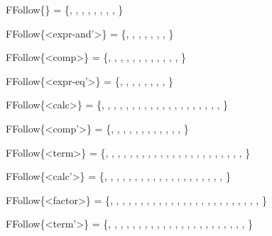 FFollow\{<expr-eq>\}         = \{\lit{\&\&}, \lit{||}, \lit{=}, \lit{\{}, \lit{)}, \lit{;}, \lit{,}, , \}

FFollow\{<expr-and'>\}       = \{\lit{||}, \lit{=}, \lit{\{}, \lit{)}, \lit{;}, \lit{,}, , \}

FFollow\{<comp>\}            = \{\lit{==}, \lit{!=}, , , \lit{\&\&}, \lit{||}, \lit{=}, \lit{\{}, \lit{)}, \lit{;}, \lit{,}, , \}

FFollow\{<expr-eq'>\}        = \{\lit{\&\&}, \lit{||}, \lit{=}, \lit{\{}, \lit{)}, \lit{;}, \lit{,}, , \}

FFollow\{<calc>\}            = \{\lit{>}, \lit{\textless}, \lit{\textless=}, \lit{>=}, , , , , \lit{==}, \lit{!=}, , , \lit{\&\&}, \lit{||}, \lit{=}, \lit{\{}, \lit{)}, \lit{;}, \lit{,}, , \}

FFollow\{<comp'>\}           = \{\lit{==}, \lit{!=}, , , \lit{\&\&}, \lit{||}, \lit{=}, \lit{\{}, \lit{)}, \lit{;}, \lit{,}, , \}

FFollow\{<term>\}            = \{\lit{+}, \lit{-}, , \lit{>}, \lit{\textless}, \lit{\textless=}, \lit{>=}, , , , , \lit{==}, \lit{!=}, , , \lit{\&\&}, \lit{||}, \lit{=}, \lit{\{}, \lit{)}, \lit{;}, \lit{,}, , \}

FFollow\{<calc'>\}           = \{\lit{>}, \lit{\textless}, \lit{\textless=}, \lit{>=}, , , , , \lit{==}, \lit{!=}, , , \lit{\&\&}, \lit{||}, \lit{=}, \lit{\{}, \lit{)}, \lit{;}, \lit{,}, , \}

FFollow\{<factor>\}          = \{\lit{*}, \lit{/}, \lit{+}, \lit{-}, , \lit{>}, \lit{\textless}, \lit{\textless=}, \lit{>=}, , , , , \lit{==}, \lit{!=}, , , \lit{\&\&}, \lit{||}, \lit{=}, \lit{\{}, \lit{)}, \lit{;}, \lit{,}, , \}

FFollow\{<term'>\}           = \{\lit{+}, \lit{-}, , \lit{>}, \lit{\textless}, \lit{\textless=}, \lit{>=}, , , , , \lit{==}, \lit{!=}, , , \lit{\&\&}, \lit{||}, \lit{=}, \lit{\{}, \lit{)}, \lit{;}, \lit{,}, , \}
